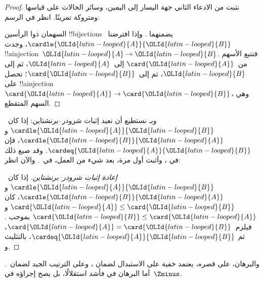 \documentclass[../../../include/open-logic-section]{subfiles}
\begin{document}
\begin{proof}
نثبت من الادعاء الثاني جهة اليسار إلى اليمين، وسائر الحالات على
قياسها ومتروكة تمرينًا. انظر في الرسم:
\begin{center}
\end{center}
السهمان ذوا الرأسين !!{bijection}s يضمنهما
. وإذا افترضنا~$\cardle{\OLId{latin-looped}{A}}{\OLId{latin-looped}{B}}$، وجدت
!!a{injection}~$\OLId{latin-looped}{A}\to \OLId{latin-looped}{B}$. فتتبع الأسهم من~$\card{\OLId{latin-looped}{A}}$ إلى~$\OLId{latin-looped}{A}$، ثم إلى
$\OLId{latin-looped}{B}$، ثم إلى~$\card{\OLId{latin-looped}{B}}$؛ تحصل على !!a{injection}
$\card{\OLId{latin-looped}{A}} \to \card{\OLId{latin-looped}{B}}$، وهي السهم المتقطع.
\end{proof}\noindent
وبـ نستطيع أن نعيد إثبات
شرودر--برنشتاين: إذا كان~$\cardle{\OLId{latin-looped}{A}}{\OLId{latin-looped}{B}}$ و$\cardle{\OLId{latin-looped}{B}}{\OLId{latin-looped}{A}}$، فإن
$\cardeq{\OLId{latin-looped}{A}}{\OLId{latin-looped}{B}}$. وقد صيغ ذلك في
، وأثبت أول مرة، بعد شيء
من العمل، في~. والآن انظر:

\begin{proof}[إعادة إثبات شرودر--برنشتاين]
إذا كان~$\cardle{\OLId{latin-looped}{A}}{\OLId{latin-looped}{B}}$ و$\cardle{\OLId{latin-looped}{B}}{\OLId{latin-looped}{A}}$، كان
$\card{\OLId{latin-looped}{A}} \leq \card{\OLId{latin-looped}{B}}$ و$\card{\OLId{latin-looped}{B}} \leq \card{\OLId{latin-looped}{A}}$ بموجب
. فيلزم~$\card{\OLId{latin-looped}{A}} = \card{\OLId{latin-looped}{B}}$، ثم
$\cardeq{\OLId{latin-looped}{A}}{\OLId{latin-looped}{B}}$، بالتثليث و.
\end{proof}
\noindent
والبرهان، على قصره، يعتمد خفية على الاستبدال لضمان
، وعلى الترتيب
الجيد لضمان~. أما البرهان في
 فأشد استقلالًا، بل يصح إجراؤه
في~$\Zminus$.
\end{document}
